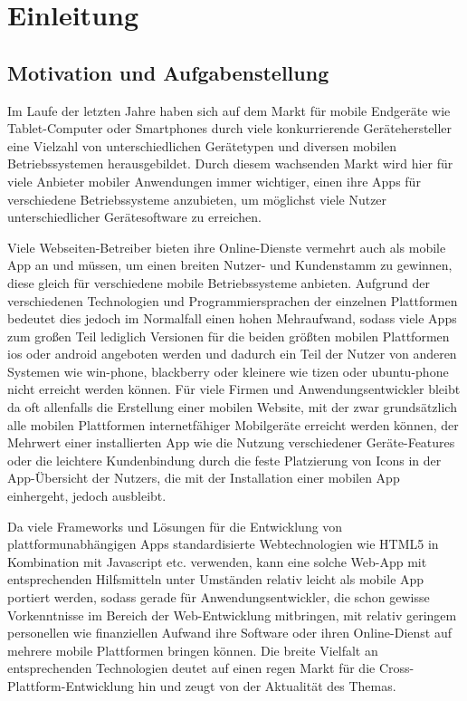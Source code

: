 
\chapter{Einleitung} \label{sec:einleitung}

\section{Motivation und Aufgabenstellung}

Im Laufe der letzten Jahre haben sich auf dem Markt für mobile Endgeräte wie Tablet-Computer oder Smartphones durch viele konkurrierende Gerätehersteller eine Vielzahl von unterschiedlichen Gerätetypen und diversen mobilen Betriebssystemen herausgebildet.
Durch diesem wachsenden Markt wird hier für viele Anbieter mobiler Anwendungen immer wichtiger, einen ihre Apps für verschiedene Betriebssysteme anzubieten, um möglichst viele Nutzer unterschiedlicher Gerätesoftware zu erreichen. %

Viele Webseiten-Betreiber bieten ihre Online-Dienste vermehrt auch als mobile App an und müssen, um einen breiten Nutzer- und Kundenstamm zu gewinnen, diese gleich für verschiedene mobile Betriebssysteme anbieten.
Aufgrund der verschiedenen Technologien und Programmiersprachen der einzelnen Plattformen bedeutet dies jedoch im Normalfall einen hohen Mehraufwand, sodass viele Apps zum großen Teil lediglich Versionen für die beiden größten mobilen Plattformen \gls{ios} oder \gls{android} angeboten werden und dadurch ein Teil der Nutzer von anderen Systemen wie \gls{win-phone}, \gls{blackberry} oder kleinere wie \gls{tizen} oder \gls{ubuntu-phone} nicht erreicht werden können. 
Für viele Firmen und Anwendungsentwickler bleibt da oft allenfalls die Erstellung einer mobilen Website, mit der zwar grundsätzlich alle mobilen Plattformen internetfähiger Mobilgeräte erreicht werden können, der Mehrwert einer installierten App wie die Nutzung verschiedener Geräte-Features oder die leichtere Kundenbindung durch die feste Platzierung von Icons in der App-Übersicht der Nutzers, die mit der Installation einer mobilen App einhergeht, jedoch ausbleibt.

Da viele Frameworks und Lösungen für die Entwicklung von plattformunabhängigen Apps standardisierte Webtechnologien wie HTML5 in Kombination mit Javascript etc. verwenden, kann eine solche Web-App mit entsprechenden Hilfsmitteln unter Umständen relativ leicht als mobile App portiert werden, sodass gerade für Anwendungsentwickler, die schon gewisse Vorkenntnisse im Bereich der Web-Entwicklung mitbringen, mit relativ geringem personellen wie finanziellen Aufwand ihre Software oder ihren Online-Dienst auf mehrere mobile Plattformen bringen können.
Die breite Vielfalt an entsprechenden Technologien deutet auf einen regen Markt für die Cross-Plattform-Entwicklung hin und zeugt von der Aktualität des Themas.

